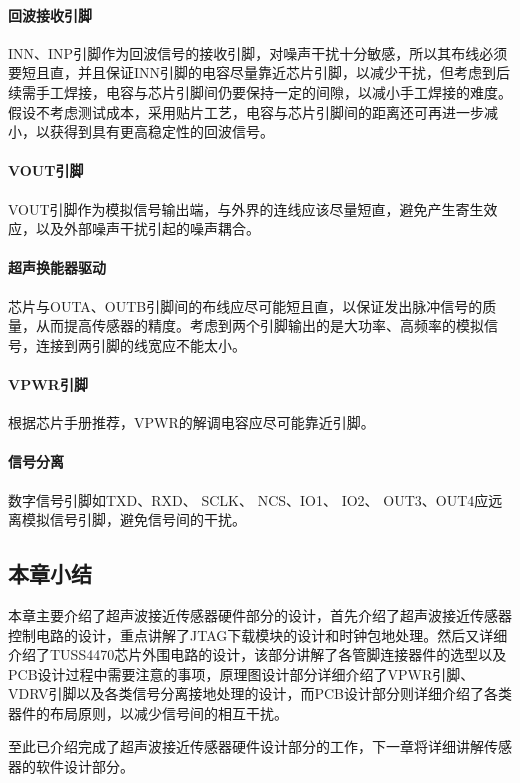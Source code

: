 \paragraph{回波接收引脚}
INN、INP引脚作为回波信号的接收引脚，对噪声干扰十分敏感，所以其布线必须要短且直，并且保证INN引脚的电容尽量靠近芯片引脚，以减少干扰，但考虑到后续需手工焊接，电容与芯片引脚间仍要保持一定的间隙，以减小手工焊接的难度。假设不考虑测试成本，采用贴片工艺，电容与芯片引脚间的距离还可再进一步减小，以获得到具有更高稳定性的回波信号。
\paragraph{VOUT引脚}
VOUT引脚作为模拟信号输出端，与外界的连线应该尽量短直，避免产生寄生效应，以及外部噪声干扰引起的噪声耦合。\par
\paragraph{超声换能器驱动}
芯片与OUTA、OUTB引脚间的布线应尽可能短且直，以保证发出脉冲信号的质量，从而提高传感器的精度。考虑到两个引脚输出的是大功率、高频率的模拟信号，连接到两引脚的线宽应不能太小。\par
\paragraph{VPWR引脚}
根据芯片手册推荐，VPWR的解调电容应尽可能靠近引脚。\par
\paragraph{信号分离}
数字信号引脚如TXD、RXD、 SCLK、 NCS、IO1、 IO2、 OUT3、OUT4应远离模拟信号引脚，避免信号间的干扰。\par
\subsection{本章小结}
本章主要介绍了超声波接近传感器硬件部分的设计，首先介绍了超声波接近传感器控制电路的设计，重点讲解了JTAG下载模块的设计和时钟包地处理。然后又详细介绍了TUSS4470芯片外围电路的设计，该部分讲解了各管脚连接器件的选型以及PCB设计过程中需要注意的事项，原理图设计部分详细介绍了VPWR引脚、VDRV引脚以及各类信号分离接地处理的设计，而PCB设计部分则详细介绍了各类器件的布局原则，以减少信号间的相互干扰。\par
至此已介绍完成了超声波接近传感器硬件设计部分的工作，下一章将详细讲解传感器的软件设计部分。




